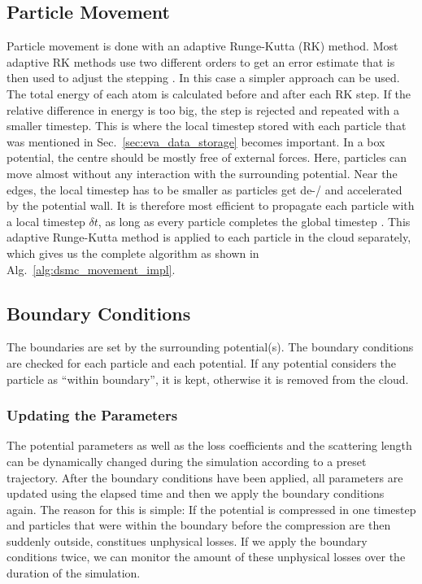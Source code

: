 \subsection{Particle Movement} \label{sec:particlemovement}
Particle movement is done with an adaptive Runge-Kutta (RK) method. Most adaptive RK methods use two different orders to get an error estimate that is then used to adjust the stepping \cite{rungekutta}. In this case a simpler approach can be used. The total energy of each atom is calculated before and after each RK step. If the relative difference in energy is too big, the step is rejected and repeated with a smaller timestep. This is where the local timestep stored with each particle that was mentioned in Sec.\ \ref{sec:eva_data_storage} becomes important. In a box potential, the centre should be mostly free of external forces. Here, particles can move almost without any interaction with the surrounding potential. Near the edges, the local timestep has to be smaller as particles get de-/ and accelerated by the potential wall. It is therefore most efficient to propagate each particle with a local timestep $\delta t$, as long as every particle completes the global timestep \Dt. This adaptive Runge-Kutta method is applied to each particle in the cloud separately, which gives us the complete algorithm as shown in Alg.~\ref{alg:dsmc_movement_impl}.

\subsection{Boundary Conditions}
The boundaries are set by the surrounding potential(s). The boundary conditions are checked for each particle and each potential. If any potential considers the particle as \enquote{within boundary}, it is kept, otherwise it is removed from the cloud.

\subsubsection*{Updating the Parameters}
The potential parameters as well as the loss coefficients and the scattering length can be dynamically changed during the simulation according to a preset trajectory. After the boundary conditions have been applied, all parameters are updated using the elapsed time and then we apply the boundary conditions again. The reason for this is simple: If the potential is compressed in one timestep and particles that were within the boundary before the compression are then suddenly outside, constitues unphysical losses. If we apply the boundary conditions twice, we can monitor the amount of these unphysical losses over the duration of the simulation.

